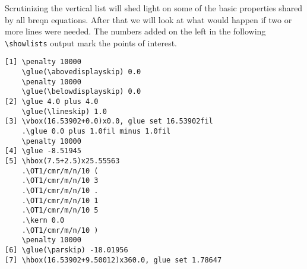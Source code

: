 \documentclass{article}
\providecommand*\cs[1]{\texttt{\textbackslash#1}}
\begin{document}
Scrutinizing the vertical list will shed light on some of the basic properties 
shared by all breqn equations. After that we will look at what would happen if 
two or more lines were needed. The numbers added on the left in the following 
\cs{showlists} output mark the points of interest. 
\begin{verbatim}
[1] \penalty 10000 
    \glue(\abovedisplayskip) 0.0 
    \penalty 10000 
    \glue(\belowdisplayskip) 0.0 
[2] \glue 4.0 plus 4.0 
    \glue(\lineskip) 1.0 
[3] \vbox(16.53902+0.0)x0.0, glue set 16.53902fil 
    .\glue 0.0 plus 1.0fil minus 1.0fil 
    \penalty 10000 
[4] \glue -8.51945 
[5] \hbox(7.5+2.5)x25.55563 
    .\OT1/cmr/m/n/10 ( 
    .\OT1/cmr/m/n/10 3 
    .\OT1/cmr/m/n/10 . 
    .\OT1/cmr/m/n/10 1 
    .\OT1/cmr/m/n/10 5 
    .\kern 0.0 
    .\OT1/cmr/m/n/10 ) 
    \penalty 10000 
[6] \glue(\parskip) -18.01956 
[7] \hbox(16.53902+9.50012)x360.0, glue set 1.78647 
\end{verbatim}
\end{document}
